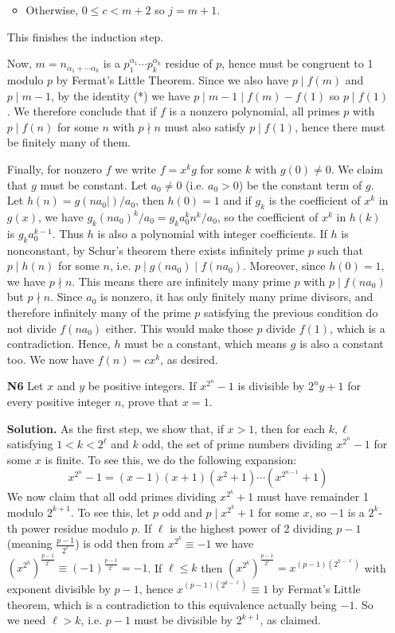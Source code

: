 \documentclass[11pt,a4paper]{article}
\begin{document}
\begin{enumerate}
\begin{itemize}
		\item Otherwise, $0\le c<m+2$ so $j=m+1$. 
	\end{itemize}
	This finishes the induction step. 
	
	Now, $m=n_{\alpha_1+\cdots \alpha_k}$ is a $p_1^{\alpha_1}\cdots p_k^{\alpha_k}$ residue of $p$, hence must be congruent to 1 modulo $p$ by Fermat's Little Theorem. 
	Since we also have $p\mid f(m)$ and $p\mid m-1$, by the identity (*) we have $p\mid m-1\mid f(m)-f(1)$ so $p\mid f(1)$. We therefore conclude that if $f$ is a nonzero polynomial, all primes $p$ with $p\mid f(n)$ for some $n$ with $p\nmid n$ must also satisfy $p\mid f(1)$, hence there must be finitely many of them. 
	
	Finally, for nonzero $f$ we write $f=x^kg$ for some $k$ with $g(0)\neq 0$. We claim that $g$ must be constant. Let $a_0\neq 0$ (i.e. $a_0>0$) be the constant term of $g$. Let $h(n) = g(na_0|)/a_0$, then $h(0)=1$ and if $g_k$ is the coefficient of $x^k$ in $g(x)$, we have $g_k(na_0)^k/a_0=g_ka_0^kn^k/a_0$, so the coefficient of $x^k$ in $h(k)$ is $g_ka_0^{k-1}$. Thus $h$ is also a polynomial with integer coefficients. If $h$ is nonconstant, by Schur's theorem there exists infinitely prime $p$ such that $p\mid h(n)$ for some $n$, i.e. $p\mid g(na_0)\mid f(na_0)$. 
	Moreover, since $h(0)=1$, we have $p\nmid n$. This means there are infinitely many prime $p$ with $p\mid f(na_0)$ but $p\nmid n$. Since $a_0$ is nonzero, it has only finitely many prime divisors, and therefore infinitely many of the prime $p$ satisfying the previous condition do not divide $f(na_0)$ either. This would make those $p$ divide $f(1)$, which is a contradiction. Hence, $h$ must be a constant, which means $g$ is also a constant too. We now have $f(n)=cx^k$, as desired. 
	
	\item[\textbf{N6}] Let $x$ and $y$ be positive integers. If ${x^{2^n}}-1$ is divisible by $2^ny+1$ for every positive integer $n$, prove that $x=1$.
	
	\textbf{Solution.} As the first step, we show that, if $x>1$, then for each $k, \ell$ satisfying $1<k<2^\ell$ and $k$ odd, the set of prime numbers dividing $x^{2^n}-1$ for some $x$ is finite. 
	To see this, we do the following expansion: 
	\[
	x^{2^n}-1=(x-1)(x+1)(x^2+1)\cdots (x^{2^{n-1}}+1)
	\]
	We now claim that all odd primes dividing $x^{2^k}+1$ must have remainder 1 modulo $2^{k+1}$. To see this, let $p$ odd and $p\mid x^{2^k}+1$ for some $x$, so $-1$ is a $2^k$-th power residue modulo $p$. 
	If $\ell$ is the highest power of 2 dividing $p-1$ (meaning $\frac{p-1}{2^\ell}$) is odd then from $x^{2^k}\equiv -1$ we have $(x^{2^k})^{\frac{p-1}{2^{\ell}}}\equiv (-1)^{\frac{p-1}{2^{\ell}}}=-1$. If $\ell\le k$ then $(x^{2^k})^{\frac{p-1}{2^{\ell}}}=x^{(p-1)(2^{k-\ell})}$ with exponent divisible by $p-1$, hence $x^{(p-1)(2^{k-\ell})}\equiv 1$ by Fermat's Little theorem, which is a contradiction to this equivalence actually being $-1$. So we need $\ell>k$, i.e. $p-1$ must be divisible by $2^{k+1}$, as claimed. 
	

\end{enumerate}
\end{document}
